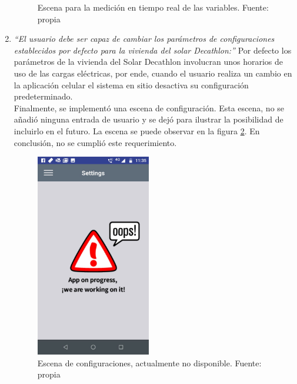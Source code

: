 \begin{enumerate}
\begin{figure}[htbp]
		\caption{Escena para la medición en tiempo real de las variables. Fuente: propia}
		\label{fig_15}
	\end{figure}
	\item  \textit{``El usuario debe ser capaz de cambiar los parámetros de configuraciones establecidos por defecto para la vivienda del solar Decathlon:''} Por defecto los parámetros de la vivienda del Solar Decathlon involucran unos horarios de uso de las cargas eléctricas, por ende, cuando el usuario realiza un cambio en la aplicación celular el sistema en sitio desactiva su configuración predeterminado. 
	\vspace{0.5cm}\\
	Finalmente, se implementó una escena de configuración. Esta escena, no se añadió ninguna entrada de usuario y se dejó para ilustrar la posibilidad de incluirlo en el futuro. La escena se puede observar en la figura \ref{fig_18}. En conclusión, no se cumplió este requerimiento.
	
	\begin{figure}[htbp]
		\centerline{\includegraphics[width=5cm]{./figuras/mobile_settings.jpeg}}
		\caption{Escena de configuraciones, actualmente no disponible. Fuente: propia}
		\label{fig_18}
	\end{figure}
	

\end{enumerate}
